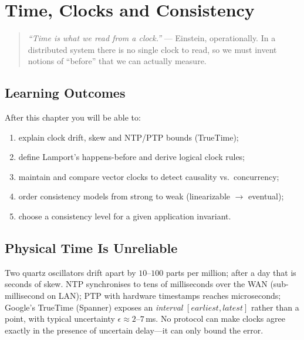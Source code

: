 \chapter{Time, Clocks and Consistency}
\label{ch:time}

\begin{quote}
\emph{``Time is what we read from a clock.''} --- Einstein, operationally. In a distributed system there is no single clock to read, so we must invent notions of ``before'' that we can actually measure.
\end{quote}

\noindent{}
\vspace{0.4em}

\section*{Learning Outcomes}
After this chapter you will be able to:
\begin{enumerate}[label=(L\arabic*)]
    \item explain clock drift, skew and NTP/PTP bounds (TrueTime);
    \item define Lamport's happens-before and derive logical clock rules;
    \item maintain and compare vector clocks to detect causality vs.\ concurrency;
    \item order consistency models from strong to weak (linearizable $\to$ eventual);
    \item choose a consistency level for a given application invariant.
\end{enumerate}

\section{Physical Time Is Unreliable}
\label{sec:physical}
Two quartz oscillators drift apart by $10$--$100$ parts per million; after a day that is seconds of skew. NTP synchronises to tens of milliseconds over the WAN (sub-millisecond on LAN); PTP with hardware timestamps reaches microseconds; Google's TrueTime (Spanner) exposes an \emph{interval} $[earliest, latest]$ rather than a point, with typical uncertainty $\epsilon\approx 2$--$7$\,ms. No protocol can make clocks agree exactly in the presence of uncertain delay---it can only bound the error.

